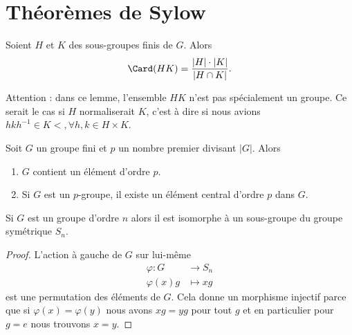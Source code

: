 
\section{Théorèmes de Sylow}

\begin{lemma}
    Soient \( H\) et \( K\) des sous-groupes finis de \( G\). Alors
    \begin{equation}
        \Card(HK)=\frac{ | H |\cdot | K | }{ | H\cap K | }.
    \end{equation}
\end{lemma} 
Attention : dans ce lemme, l'ensemble \( HK\) n'est pas spécialement un groupe. Ce serait le cas si \( H\) normaliserait \( K\), c'est à dire si nous avions \( hkh^{-1}\in K<,\forall h,k\in H\times K\).

\begin{theorem}\label{ThoCauchyGpFini}
    Soit \( G\) un groupe fini et \( p\) un nombre premier divisant \( | G |\). Alors 
    \begin{enumerate}
        \item
            \( G\) contient un élément d'ordre \( p\).  
        \item
            Si \( G\) est un \( p\)-groupe, il existe un élément central d'ordre \( p\) dans \( G\).
    \end{enumerate}
\end{theorem}

\begin{lemma}    \label{ThoIfdlEB}   
    Si \( G\) est un groupe d'ordre \( n\) alors il est isomorphe à un sous-groupe du groupe symétrique \( S_n\).
\end{lemma}

\begin{proof}
    L'action à gauche de \( G\) sur lui-même
    \begin{equation}
        \begin{aligned}
            \varphi\colon G&\to S_n \\
            \varphi(x)g&\mapsto xg 
        \end{aligned}
    \end{equation}
    est une permutation des éléments de \( G\). Cela donne un morphisme injectif parce que si \( \varphi(x)=\varphi(y)\) nous avons \( xg=yg\) pour tout \( g\) et en particulier pour \( g=e\) nous trouvons \( x=y\).
\end{proof}

